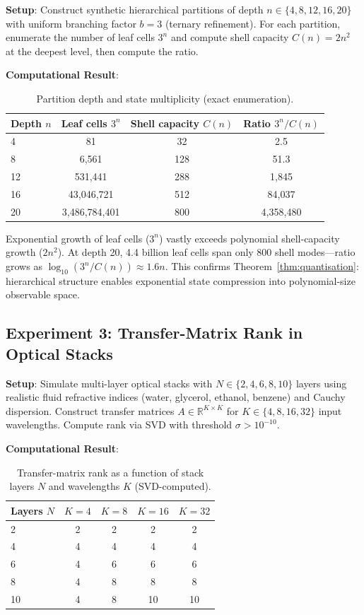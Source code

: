 \documentclass[11pt,twocolumn,a4paper]{article}
\theoremstyle{definition}
\begin{document}
\textbf{Setup}: Construct synthetic hierarchical partitions of depth $n \in \{4, 8, 12, 16, 20\}$ with uniform branching factor $b=3$ (ternary refinement). For each partition, enumerate the number of leaf cells $3^n$ and compute shell capacity $C(n) = 2n^2$ at the deepest level, then compute the ratio.

\textbf{Computational Result}:

\begin{table}[H]
\centering\small
\caption{Partition depth and state multiplicity (exact enumeration).}
\begin{tabular}{lccc}
\toprule
Depth $n$ & Leaf cells $3^n$ & Shell capacity $C(n)$ & Ratio $3^n / C(n)$ \\
\midrule
4  & 81 & 32 & 2.5 \\
8  & 6,561 & 128 & 51.3 \\
12 & 531,441 & 288 & 1,845 \\
16 & 43,046,721 & 512 & 84,037 \\
20 & 3,486,784,401 & 800 & 4,358,480 \\
\bottomrule
\end{tabular}
\end{table}

Exponential growth of leaf cells ($3^n$) vastly exceeds polynomial shell-capacity growth ($2n^2$). At depth 20, 4.4 billion leaf cells span only 800 shell modes—ratio grows as $\log_{10}(3^n/C(n)) \approx 1.6n$. This confirms Theorem~\ref{thm:quantisation}: hierarchical structure enables exponential state compression into polynomial-size observable space.

\subsection{Experiment 3: Transfer-Matrix Rank in Optical Stacks}

\textbf{Setup}: Simulate multi-layer optical stacks with $N \in \{2, 4, 6, 8, 10\}$ layers using realistic fluid refractive indices (water, glycerol, ethanol, benzene) and Cauchy dispersion. Construct transfer matrices $A \in \mathbb{R}^{K \times K}$ for $K \in \{4, 8, 16, 32\}$ input wavelengths. Compute rank via SVD with threshold $\sigma > 10^{-10}$.

\textbf{Computational Result}:

\begin{table}[H]
\centering\small
\caption{Transfer-matrix rank as a function of stack layers $N$ and wavelengths $K$ (SVD-computed).}
\begin{tabular}{lcccc}
\toprule
Layers $N$ & $K=4$ & $K=8$ & $K=16$ & $K=32$ \\
\midrule
2 & 2 & 2 & 2 & 2 \\
4 & 4 & 4 & 4 & 4 \\
6 & 4 & 6 & 6 & 6 \\
8 & 4 & 8 & 8 & 8 \\
10 & 4 & 8 & 10 & 10 \\
\bottomrule
\end{tabular}
\end{table}
\end{document}
